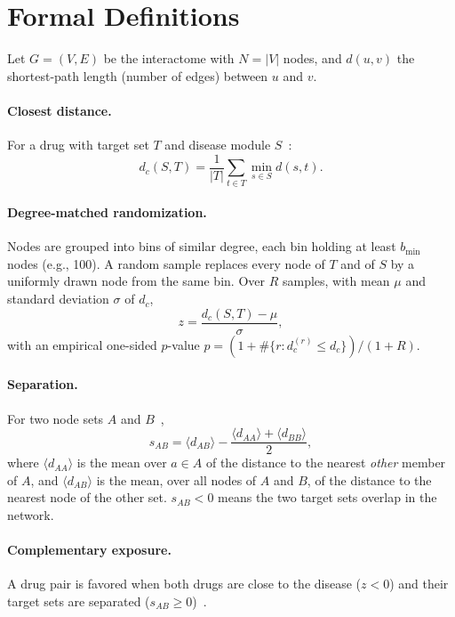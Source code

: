 \section{Formal Definitions}
\label{app:math}

Let $G=(V,E)$ be the interactome with $N=|V|$ nodes, and $d(u,v)$ the shortest-path length (number of edges) between $u$ and $v$.

\paragraph{Closest distance.} For a drug with target set $T$ and disease module
$S$~\cite{guney2016network}:
\begin{equation}
  d_c(S,T) = \frac{1}{|T|}\sum_{t\in T}\min_{s\in S} d(s,t).
\end{equation}

\paragraph{Degree-matched randomization.} Nodes are grouped into bins of similar degree, each bin holding at least $b_{\min}$ nodes (e.g., 100). A random sample replaces every node of $T$ and of $S$ by a uniformly drawn node from the same bin. Over $R$ samples, with mean $\mu$ and standard deviation
$\sigma$ of $d_c$,
\begin{equation}
  z = \frac{d_c(S,T)-\mu}{\sigma},
\end{equation}
with an empirical one-sided $p$-value $p = (1+\#\{r: d_c^{(r)}\le d_c\})/(1+R)$.

\paragraph{Separation.} For two node sets $A$ and
$B$~\cite{menche2015uncovering},
\begin{equation}
  s_{AB} = \langle d_{AB}\rangle - \frac{\langle d_{AA}\rangle + \langle d_{BB}\rangle}{2},
\end{equation}
where $\langle d_{AA}\rangle$ is the mean over $a\in A$ of the distance to the nearest \emph{other} member of $A$, and $\langle d_{AB}\rangle$ is the mean, over all nodes of $A$ and $B$, of the distance to the nearest node of the other set. $s_{AB}<0$ means the two target sets overlap in the network.

\paragraph{Complementary exposure.} A drug pair is favored when both drugs are close to the disease ($z<0$) and their target sets are separated ($s_{AB}\ge0$)~\cite{cheng2019network}.

